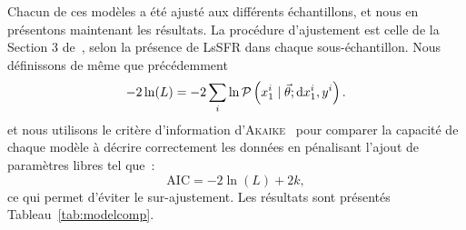 \documentclass[../main/main.tex]{subfiles}
\begin{document}
Chacun de ces modèles a été ajusté aux différents échantillons, et nous en
présentons maintenant les résultats. La procédure d'ajustement est celle de la
Section 3 de~, selon la présence de LsSFR dans chaque
sous-échantillon. Nous définissons de même que précédemment
\begin{equation}\label{eq:likelihood2}
    -2\ln(L) = -2 \sum_i \ln \mathcal{P}\left(x_1^i \mid \vec{\theta};
    \mathrm{d}x_1^i, y^i\right).
\end{equation}
et nous utilisons le critère d'information
d'\textsc{Akaike}~\citep[AIC,][]{burnham2004} pour comparer la capacité de
chaque modèle à décrire correctement les données en pénalisant l'ajout de
paramètres libres tel que~:
\begin{equation}
    \mathrm{AIC} = -2\ln(L) + 2k,
\end{equation}
ce qui permet d'éviter le sur-ajustement. Les résultats sont présentés
Tableau~\ref{tab:modelcomp}.
\end{document}
